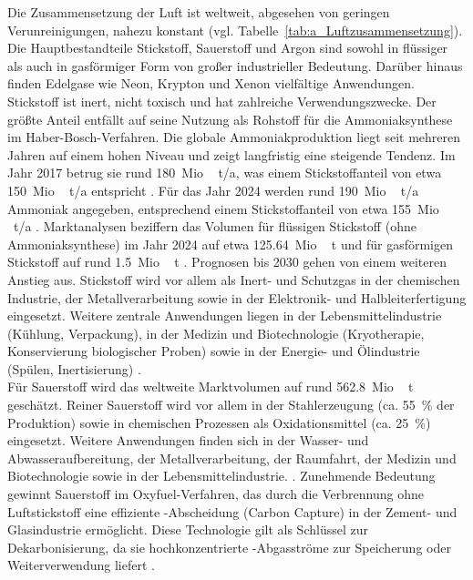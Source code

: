 Die Zusammensetzung der Luft ist weltweit, abgesehen von geringen Verunreinigungen, nahezu konstant (vgl. Tabelle~\ref{tab:a_Luftzusammensetzung}). Die Hauptbestandteile Stickstoff, Sauerstoff und Argon sind sowohl in flüssiger als auch in gasförmiger Form von großer industrieller Bedeutung. Darüber hinaus finden Edelgase wie Neon, Krypton und Xenon vielfältige Anwendungen. \\
Stickstoff ist inert, nicht toxisch und hat zahlreiche Verwendungszwecke. Der größte Anteil entfällt auf seine Nutzung als Rohstoff für die Ammoniaksynthese im Haber-Bosch-Verfahren. Die globale Ammoniakproduktion liegt seit mehreren Jahren auf einem hohen Niveau und zeigt langfristig eine steigende Tendenz. Im Jahr 2017 betrug sie rund \SI{180}{Mio.\,t/a}, was einem Stickstoffanteil von etwa \SI{150}{Mio.\,t/a} entspricht \cite{mingollaLowcarbonAmmoniaProduction2025,MediumTermFertilizer}. Für das Jahr 2024 werden rund \SI{190}{Mio.\,t/a} Ammoniak angegeben, entsprechend einem Stickstoffanteil von etwa \SI{155}{Mio.\,t/a} \cite{IFAShortTermFertilizerOutlook2025}. Marktanalysen beziffern das Volumen für flüssigen Stickstoff (ohne Ammoniaksynthese) im Jahr 2024 auf etwa \SI{125,64}{Mio.\,t} \cite{LiquidNitrogenMarket2025,kiranpulidindiMarktgrosseMarktanteilUnd2024} und für gasförmigen Stickstoff auf rund \SI{1,5}{Mio.\,t} \cite{IndustrialGasMarket2025,pulidindiNitrogenGasMarket2024}. Prognosen bis 2030 gehen von einem weiteren Anstieg aus. Stickstoff wird vor allem als Inert- und Schutzgas in der chemischen Industrie, der Metallverarbeitung sowie in der Elektronik- und Halbleiterfertigung eingesetzt. Weitere zentrale Anwendungen liegen in der Lebensmittelindustrie (Kühlung, Verpackung), in der Medizin und Biotechnologie (Kryotherapie, Konservierung biologischer Proben) sowie in der Energie- und Ölindustrie (Spülen, Inertisierung) \cite{nickbockerUllmannsEncyclopediaIndustrial2000, LiquidNitrogenMarket2025}. \\
Für Sauerstoff wird das weltweite Marktvolumen auf rund \SI{562,8}{Mio.\,t} geschätzt. Reiner Sauerstoff wird vor allem in der Stahlerzeugung (ca. \SI{55}{\percent} der Produktion) sowie in chemischen Prozessen als Oxidationsmittel (ca. \SI{25}{\percent}) eingesetzt. Weitere Anwendungen finden sich in der Wasser- und Abwasseraufbereitung, der Metallverarbeitung, der Raumfahrt, der Medizin und Biotechnologie sowie in der Lebensmittelindustrie. \cite{nickbockerUllmannsEncyclopediaIndustrial2000, heinz-wolfgangharingAirGasesNitrogen2007}. Zunehmende Bedeutung gewinnt Sauerstoff im Oxyfuel-Verfahren, das durch die Verbrennung ohne Luftstickstoff eine effiziente -Abscheidung (Carbon Capture) in der Zement- und Glasindustrie ermöglicht. Diese Technologie gilt als Schlüssel zur Dekarbonisierung, da sie hochkonzentrierte -Abgasströme zur Speicherung oder Weiterverwendung liefert \cite{rahoTechnologicalEconomicEmission2025}. \\
